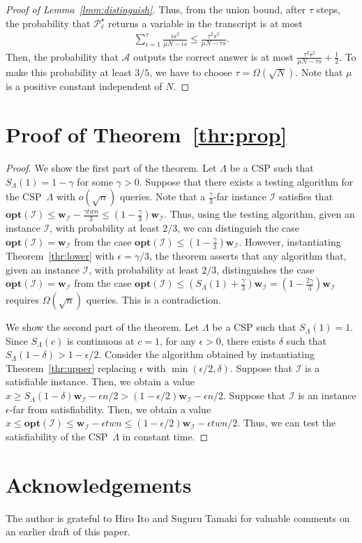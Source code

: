 \documentclass[letterpaper, 11pt]{article}
\newcommand{\calA}{\mathcal{A}}
\newcommand{\calI}{\mathcal{I}}
\newcommand{\calP}{\mathcal{P}}
\newcommand{\biw}{\boldsymbol{w}}
\newcommand{\opt}{\mathbf{opt}}
\begin{document}
\begin{proof}[Proof of Lemma~\ref{lmm:distinguish}]
  Thus, from the union bound,
  after $\tau$ steps,
  the probability that $\calP^{\star}_{\ell}$ returns a variable in the transcript is at most 
  \begin{eqnarray*}
    \sum_{i=1}^{\tau} \frac{is^2}{\mu N-is} \leq \frac{\tau^2s^2}{\mu N-\tau s}.
  \end{eqnarray*}
  Then, the probability that $\calA$ outputs the correct answer is at most $\frac{\tau^2s^2}{\mu N-\tau s} + \frac{1}{2}$.
  To make this probability at least $3/5$, we have to choose $\tau = \Omega(\sqrt{N})$.
  Note that $\mu$ is a positive constant independent of $N$.
\end{proof}

\section{Proof of Theorem~\ref{thr:prop}}\label{apx:prop}
\begin{proof}
  We show the first part of the theorem.
  Let $\Lambda$ be a CSP such that $S_{\Lambda}(1) = 1-\gamma$ for some $\gamma>0$.
  Suppose that there exists a testing algorithm for the CSP~$\Lambda$ with $o(\sqrt{n})$ queries.
  Note that a $\frac{\gamma}{3}$-far instance $\calI$ satisfies that $\opt(\calI) \leq \biw_{\calI}-\frac{\gamma twn}{3} \leq (1 - \frac{\gamma}{3})\biw_{\calI}$.
  Thus, using the testing algorithm, given an instance $\calI$, 
  with probability at least $2/3$,
  we can distinguish the case $\opt(\calI) = \biw_{\calI}$ from the case $\opt(\calI) \leq (1-\frac{\gamma}{3})\biw_{\calI}$.
  However, instantiating Theorem~\ref{thr:lower} with $\epsilon = \gamma/3$,
  the theorem asserts that
  any algorithm that, given an instance $\calI$, 
  with probability at least $2/3$,
  distinguishes the case $\opt(\calI) = \biw_{\calI}$ from the case $\opt(\calI) \leq (S_{\Lambda}(1)+\frac{\gamma}{3})\biw_{\calI} = (1-\frac{2\gamma}{3})\biw_{\calI}$ requires $\Omega(\sqrt{n})$ queries.
  This is a contradiction.
  
  We show the second part of the theorem.
  Let $\Lambda$ be a CSP such that $S_{\Lambda}(1) = 1$.
  Since $S_{\Lambda}(c)$ is continuous at $c=1$,
  for any $\epsilon>0$, there exists $\delta$ such that 
  $S_{\Lambda}(1-\delta) > 1-\epsilon/2$.
  Consider the algorithm obtained by instantiating Theorem~\ref{thr:upper} replacing $\epsilon$ with $\min(\epsilon/2,\delta)$.
  Suppose that $\calI$ is a satisfiable instance.
  Then, we obtain a value $x \geq S_{\Lambda}(1-\delta)\biw_{\calI}- \epsilon n/2 > (1-\epsilon/2)\biw_{\calI} - \epsilon n/2 $.
  Suppose that $\calI$ is an instance $\epsilon$-far from satisfiability.
  Then, we obtain a value $x \leq \opt(\calI) \leq \biw_{\calI} - \epsilon twn \leq (1-\epsilon/2)\biw_{\calI} - \epsilon twn/2$.
  Thus, we can test the satisfiability of the CSP~$\Lambda$ in constant time.
\end{proof}


\section*{Acknowledgements}
The author is grateful to Hiro Ito and Suguru Tamaki for valuable comments on an earlier draft of this paper.
\end{document}
